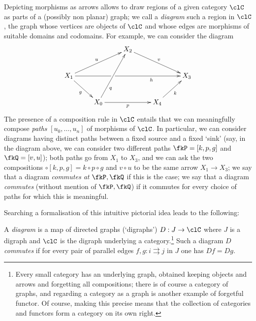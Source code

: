 \documentclass[11pt]{article}
\begin{document}
\begin{remark}\leavevmode
	Depicting morphisms as arrows allows to draw regions of a given category $\clC$ as parts of a (possibly non planar) graph; we call a \emph{diagram} such a region in $\clC$, the graph whose vertices are objects of $\clC$ and whose edges are morphisms of suitable domains and codomains. For example, we can consider the diagram
	\[
		\vcenter{\xymatrix{
				&&X_2\ar[drr]^v&& \\
				X_1\ar[dr]_g\ar[urr]^u\ar[rrrr]|(.375)\hole_(.7)h&&&&X_3\\
				& X_0 \ar[uur]_(.3)q\ar[rr]_p&& X_4 \ar[ur]_k&
			}}
	\]
	The presence of a composition rule in $\clC$ entails that we can meaningfully compose \emph{paths} $[u_0,\dots, u_n]$ of morphisms of $\clC$. In particular, we can consider diagrams having distinct paths between a fixed source and a fixed `sink' (say, in the diagram above, we can consider two different paths $\fkP = [k,p,g]$ and $\fkQ = [v,u]$); both paths go from $X_1$ to $X_3$, and we can ask the two compositions $\circ[k,p,g] = k\circ p\circ g$ and $v\circ u$ to be the same arrow $X_1\to X_3$; we say that a diagram \emph{commutes at $\fkP,\fkQ$} if this is the case; we say that a diagram \emph{commutes} (without mention of $\fkP, \fkQ$) if it commutes for every choice of paths for which this is meaningful.
\end{remark}
Searching a formalisation of this intuitive pictorial idea leads to the following:
\begin{definition}
	A \emph{diagram} is a map of directed graphs (`digraphs') $D : J \to \clC$ where $J$ is a digraph and $\clC$ is the digraph underlying a category.\footnote{Every small category has an underlying graph, obtained keeping objects and arrows and forgetting all compositions; there is of course a category of graphs, and regarding a category as a graph is another example of forgetful functor. Of course, making this precise means that the collection of categories and functors form a category on its own right.} Such a diagram $D$ \emph{commutes} if for every pair of parallel edges $f,g : i\rightrightarrows j$ in $J$ one has $Df = Dg$.
\end{definition}
\end{document}
